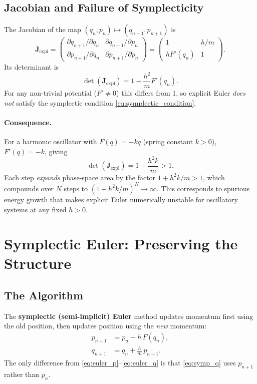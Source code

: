 \documentclass[11pt]{article}
\newcommand{\J}{\mathbf{J}}          %
\begin{document}
\subsection{Jacobian and Failure of Symplecticity}

The Jacobian of the map $(q_n, p_n) \mapsto (q_{n+1}, p_{n+1})$ is
\begin{equation}\label{eq:euler_jacobian}
  \J_{\mathrm{expl}} =
  \begin{pmatrix}
    \partial q_{n+1}/\partial q_n & \partial q_{n+1}/\partial p_n \\
    \partial p_{n+1}/\partial q_n & \partial p_{n+1}/\partial p_n
  \end{pmatrix}
  =
  \begin{pmatrix}
    1 & h/m \\
    h F'(q_n) & 1
  \end{pmatrix}.
\end{equation}
Its determinant is
\begin{equation}\label{eq:euler_det}
  \det(\J_{\mathrm{expl}}) = 1 - \frac{h^2}{m} F'(q_n).
\end{equation}
For any non-trivial potential ($F' \neq 0$) this differs from 1, so explicit
Euler \emph{does not} satisfy the symplectic condition
\eqref{eq:symplectic_condition}.

\paragraph{Consequence.}
For a harmonic oscillator with $F(q) = -kq$ (spring constant $k > 0$),
$F'(q) = -k$, giving
\[
  \det(\J_{\mathrm{expl}}) = 1 + \frac{h^2 k}{m} > 1.
\]
Each step \emph{expands} phase-space area by the factor
$1 + h^2 k/m > 1$, which compounds over $N$ steps to
$(1 + h^2 k/m)^N \to \infty$.  This corresponds to spurious energy growth
that makes explicit Euler numerically unstable for oscillatory systems at
any fixed $h > 0$.

\section{Symplectic Euler: Preserving the Structure}

\subsection{The Algorithm}

The \textbf{symplectic (semi-implicit) Euler} method updates momentum first
using the old position, then updates position using the \emph{new} momentum:
\begin{align}
  p_{n+1} &= p_n + h\, F(q_n), \label{eq:symp_p}\\
  q_{n+1} &= q_n + \frac{h}{m}\, p_{n+1}. \label{eq:symp_q}
\end{align}
The only difference from \eqref{eq:euler_p}--\eqref{eq:euler_q} is that
\eqref{eq:symp_q} uses $p_{n+1}$ rather than $p_n$.
\end{document}
